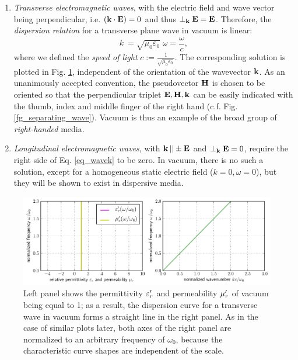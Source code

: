 \begin{enumerate}
 \item{\textit{Transverse electromagnetic waves}, with the electric field and wave vector being perpendicular, i.e. $({\mathbf{k}} \cdot \mathbf{E}) = 0$ and thus $\perp_{\mathbf{k}}\mathbf{E} = \mathbf{E}$. Therefore, the \textit{dispersion relation} for a transverse plane wave in vacuum is linear:
\begin{equation} k~= \sqrt{\mu_0 \varepsilon_0}\; \omega = \frac{\omega}{c}, \label{eq_dispeq_vac}\end{equation}
	where we defined the \textit{speed of light} $c := \frac{1}{\sqrt{\mu_0 \varepsilon_0}}$. The corresponding solution is plotted in Fig. \ref{fg_dcvac}, independent of the orientation of the wavevector ${\mathbf{k}}$. As an unanimously accepted convention, the pseudovector $\mathbf{H}$ is chosen to be oriented so that the perpendicular triplet $\mathbf{E},\mathbf{H},{\mathbf{k}}$ can be easily indicated with the thumb, index and middle finger of the right hand (c.f. Fig. \ref{fg_separating_wave}). Vacuum is thus an example of the broad group of \textit{right-handed} media.
} 
 \item{\textit{Longitudinal electromagnetic waves}, with ${\mathbf{k}}\,|| \pm \mathbf{E}$ and $\perp_{\mathbf{k}}\mathbf{E} = 0$, require the right side of Eq. \ref{eq_wavek} to be zero. In vacuum, there is no such a solution, except for a homogeneous static electric field ($k = 0, \omega = 0$), but they will be shown to exist in dispersive media.} 
 \end{enumerate}
 \begin{figure}[t] \caption{Left panel shows the permittivity $\varepsilon_r'$ and permeability $\mu_r'$ of vacuum being equal to 1; as a result, the dispersion curve for a transverse wave in vacuum forms a straight line in the right panel. As in the case of similar plots later, both axes of the right panel are normalized to an arbitrary frequency of $\omega_0$, because the characteristic curve shapes are independent of the scale.} \label{fg_dcvac} \centering 
	\includegraphics[width=\textwidth]{img/dispersion_landau_lifshitz/dispersion_vacuum.pdf}
\end{figure}

